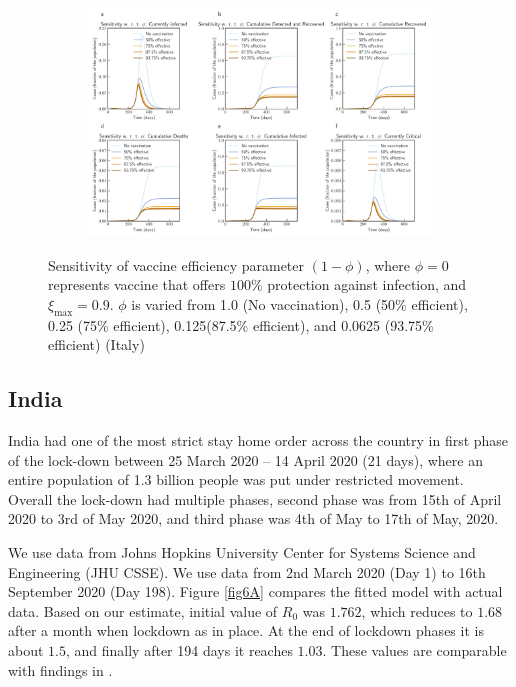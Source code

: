 \documentclass[authoryear,preprint]{elsarticle}
\begin{document}
\begin{figure}[t!]
	\centering
	\begin{subfigure}[b]{\textwidth}
		\centering
		\includegraphics[width=1\linewidth]{Italy_scenario_vaccination0.8.pdf}
	\end{subfigure}
	\caption{Sensitivity of vaccine efficiency parameter $(1-\phi)$, where $\phi = 0$ represents vaccine that offers $100\%$ protection against infection, and $\xi_{\max} = 0.9$. $\phi$ is varied from 1.0 (No vaccination), 0.5 (50\% efficient), 0.25 (75\% efficient), 0.125(87.5\% efficient), and 0.0625 (93.75\% efficient) (Italy)}
	\label{fig5B} 
\end{figure}
%
\subsection{India}
India had one of the most strict stay home order across the country in first phase of the lock-down between 25 March 2020 – 14 April 2020 (21 days), where an entire population of 1.3 billion people was put under restricted movement. Overall the lock-down had multiple phases, second phase was from 15th of April 2020 to 3rd of May 2020, and third phase was 4th of May to 17th of May, 2020.

We use data from Johns Hopkins University Center for Systems Science and Engineering (JHU CSSE). We use data from 2nd March 2020 (Day 1) to 16th September 2020 (Day 198). Figure \ref{fig6A} compares the fitted model with actual data. Based on our estimate, initial value of $R_0$ was $1.762$, which reduces to $1.68$ after a month when lockdown as in place. At the end of lockdown phases it is about $1.5$, and finally after 194 days it reaches $1.03$. These values are comparable with findings in \cite{Chhabra2020.07.10.20150631,MARIMUTHU2020}.
\end{document}
